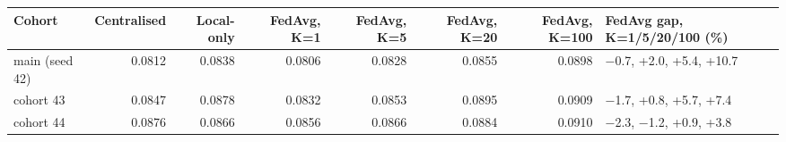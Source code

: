 \begin{tabular}{lrrrrrrl}
\toprule
Cohort & Centralised & Local-only & FedAvg, K=1 & FedAvg, K=5 & FedAvg, K=20 & FedAvg, K=100 & FedAvg gap, K=1/5/20/100 (\%) \\
\midrule
main (seed 42) & 0.0812 & 0.0838 & 0.0806 & 0.0828 & 0.0855 & 0.0898 & −0.7, +2.0, +5.4, +10.7 \\
cohort 43 & 0.0847 & 0.0878 & 0.0832 & 0.0853 & 0.0895 & 0.0909 & −1.7, +0.8, +5.7, +7.4 \\
cohort 44 & 0.0876 & 0.0866 & 0.0856 & 0.0866 & 0.0884 & 0.0910 & −2.3, −1.2, +0.9, +3.8 \\
\bottomrule
\end{tabular}
